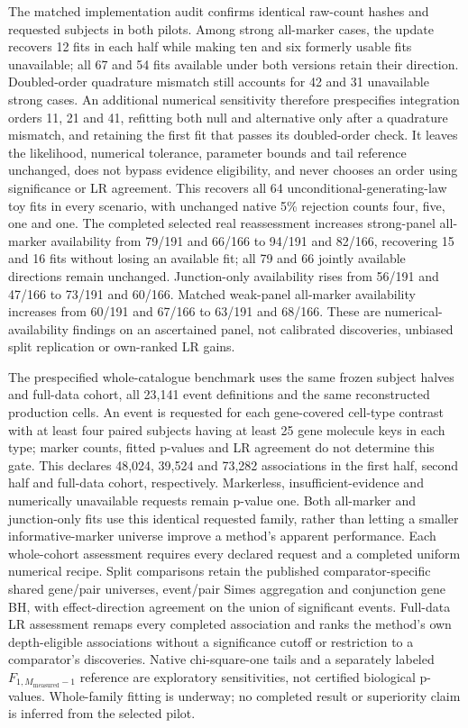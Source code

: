 \documentclass[11pt]{article}
\begin{document}
The matched implementation audit confirms identical raw-count hashes and requested subjects in both pilots. Among strong all-marker cases, the update recovers 12 fits in each half while making ten and six formerly usable fits unavailable; all 67 and 54 fits available under both versions retain their direction. Doubled-order quadrature mismatch still accounts for 42 and 31 unavailable strong cases. An additional numerical sensitivity therefore prespecifies integration orders 11, 21 and 41, refitting both null and alternative only after a quadrature mismatch, and retaining the first fit that passes its doubled-order check. It leaves the likelihood, numerical tolerance, parameter bounds and tail reference unchanged, does not bypass evidence eligibility, and never chooses an order using significance or LR agreement. This recovers all 64 unconditional-generating-law toy fits in every scenario, with unchanged native 5\% rejection counts four, five, one and one. The completed selected real reassessment increases strong-panel all-marker availability from 79/191 and 66/166 to 94/191 and 82/166, recovering 15 and 16 fits without losing an available fit; all 79 and 66 jointly available directions remain unchanged. Junction-only availability rises from 56/191 and 47/166 to 73/191 and 60/166. Matched weak-panel all-marker availability increases from 60/191 and 67/166 to 63/191 and 68/166. These are numerical-availability findings on an ascertained panel, not calibrated discoveries, unbiased split replication or own-ranked LR gains.

The prespecified whole-catalogue benchmark uses the same frozen subject halves and full-data cohort, all 23,141 event definitions and the same reconstructed production cells. An event is requested for each gene-covered cell-type contrast with at least four paired subjects having at least 25 gene molecule keys in each type; marker counts, fitted p-values and LR agreement do not determine this gate. This declares 48,024, 39,524 and 73,282 associations in the first half, second half and full-data cohort, respectively. Markerless, insufficient-evidence and numerically unavailable requests remain p-value one. Both all-marker and junction-only fits use this identical requested family, rather than letting a smaller informative-marker universe improve a method's apparent performance. Each whole-cohort assessment requires every declared request and a completed uniform numerical recipe. Split comparisons retain the published comparator-specific shared gene/pair universes, event/pair Simes aggregation and conjunction gene BH, with effect-direction agreement on the union of significant events. Full-data LR assessment remaps every completed association and ranks the method's own depth-eligible associations without a significance cutoff or restriction to a comparator's discoveries. Native chi-square-one tails and a separately labeled \(F_{1,M_\mathrm{measured}-1}\) reference are exploratory sensitivities, not certified biological p-values. Whole-family fitting is underway; no completed result or superiority claim is inferred from the selected pilot.
\end{document}
